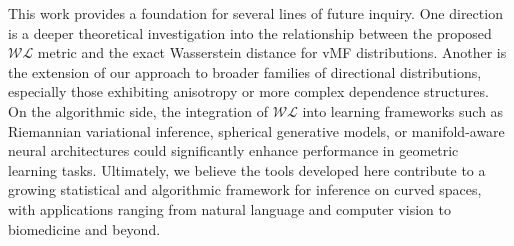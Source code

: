 \documentclass[10pt]{article}
\newcommand{\WL}{\mathcal{WL}}
\begin{document}
This work provides a foundation for several lines of future inquiry. One direction is a deeper theoretical investigation into the relationship between the proposed $\WL$ metric and the exact Wasserstein distance for vMF distributions. Another is the extension of our approach to broader families of directional distributions, especially those exhibiting anisotropy or more complex dependence structures. On the algorithmic side, the integration of $\WL$ into learning frameworks such as Riemannian variational inference, spherical generative models, or manifold-aware neural architectures could significantly enhance performance in geometric learning tasks. Ultimately, we believe the tools developed here contribute to a growing statistical and algorithmic framework for inference on curved spaces, with applications ranging from natural language and computer vision to biomedicine and beyond.
\end{document}
